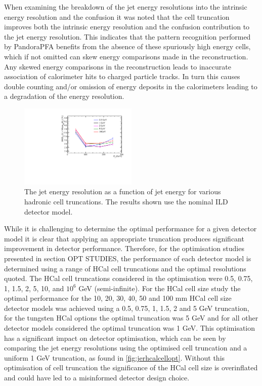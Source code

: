 When examining the breakdown of the jet energy resolutions into the intrinsic energy resolution and the confusion it was noted that the cell truncation improves both the intrinsic energy resolution and the confusion contribution to the jet energy resolution.  This indicates that the pattern recognition performed by PandoraPFA benefits from the absence of these spuriously high energy cells, which if not omitted can skew energy comparisons made in the reconstruction.  Any skewed energy comparisons in the reconstruction leads to inaccurate association of calorimeter hits to charged particle tracks.  In turn this causes double counting and/or omission of energy deposits in the calorimeters leading to a degradation of the energy resolution.  

\begin{figure}
\includegraphics[width=0.5\textwidth]{EnergyEstimators/Plots/CellTruncation/JER_vs_JetEnergy_HCalCellTruncation.pdf}
\caption[The jet energy resolution as a function of jet energy for various hadronic cell truncations.  The results shown use the nominal ILD detector model.]{The jet energy resolution as a function of jet energy for various hadronic cell truncations.  The results shown use the nominal ILD detector model.}
\label{fig:jercelltrunc}
\end{figure}

While it is challenging to determine the optimal performance for a given detector model it is clear that applying an appropriate truncation produces significant improvement in detector performance.  Therefore, for the optimisation studies presented in section OPT STUDIES, the performance of each detector model is determined using a range of HCal cell truncations and the optimal resolutions quoted.  The HCal cell truncations considered in the optimisation were 0.5, 0.75, 1, 1.5, 2, 5, 10, and $10^{6}$ GeV (semi-infinite).  For the HCal cell size study the optimal performance for the 10, 20, 30, 40, 50 and 100 mm HCal cell size detector models was achieved using a 0.5, 0.75, 1, 1.5, 2 and 5 GeV truncation, for the tungsten HCal options the optimal truncation was 5 GeV and for all other detector models considered the optimal truncation was 1 GeV.  This optimisation has a significant impact on detector optimisation, which can be seen by comparing the jet energy resolutions using the optimised cell truncation and a uniform 1 GeV truncation, as found in \ref{fig:jerhcalcellopt}.  Without this optimisation of cell truncation the significance of the HCal cell size is overinflated and could have led to a misinformed detector design choice.  

